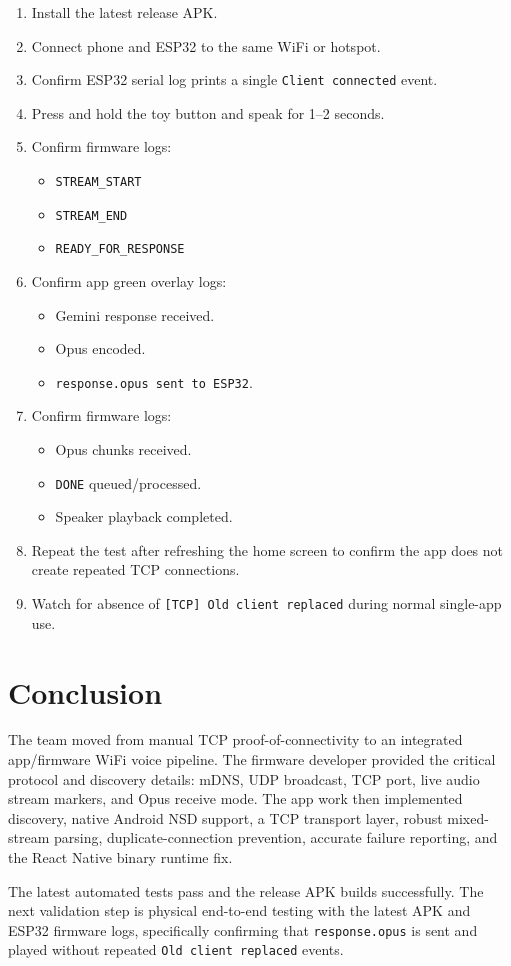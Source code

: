 \documentclass[11pt,a4paper]{article}
\begin{document}
\begin{enumerate}[leftmargin=*]
  \item Install the latest release APK.
  \item Connect phone and ESP32 to the same WiFi or hotspot.
  \item Confirm ESP32 serial log prints a single \texttt{Client connected} event.
  \item Press and hold the toy button and speak for 1--2 seconds.
  \item Confirm firmware logs:
    \begin{itemize}
      \item \texttt{STREAM\_START}
      \item \texttt{STREAM\_END}
      \item \texttt{READY\_FOR\_RESPONSE}
    \end{itemize}
  \item Confirm app green overlay logs:
    \begin{itemize}
      \item Gemini response received.
      \item Opus encoded.
      \item \texttt{response.opus sent to ESP32}.
    \end{itemize}
  \item Confirm firmware logs:
    \begin{itemize}
      \item Opus chunks received.
      \item \texttt{DONE} queued/processed.
      \item Speaker playback completed.
    \end{itemize}
  \item Repeat the test after refreshing the home screen to confirm the app does not create repeated TCP connections.
  \item Watch for absence of \texttt{[TCP] Old client replaced} during normal single-app use.
\end{enumerate}

\section{Conclusion}

The team moved from manual TCP proof-of-connectivity to an integrated app/firmware WiFi voice pipeline. The firmware developer provided the critical protocol and discovery details: mDNS, UDP broadcast, TCP port, live audio stream markers, and Opus receive mode. The app work then implemented discovery, native Android NSD support, a TCP transport layer, robust mixed-stream parsing, duplicate-connection prevention, accurate failure reporting, and the React Native binary runtime fix.

The latest automated tests pass and the release APK builds successfully. The next validation step is physical end-to-end testing with the latest APK and ESP32 firmware logs, specifically confirming that \texttt{response.opus} is sent and played without repeated \texttt{Old client replaced} events.
\end{document}
